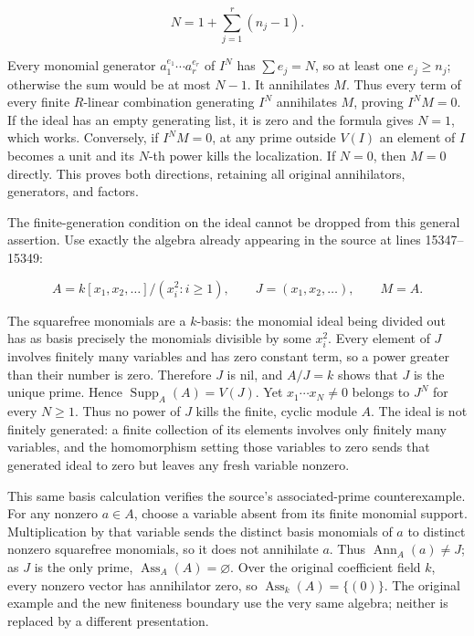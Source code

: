 \[
N=1+\sum_{j=1}^r(n_j-1).
\]

Every monomial generator \(a_1^{e_1}\cdots a_r^{e_r}\) of \(I^N\) has \(\sum e_j=N\), so at least one \(e_j\geq n_j\); otherwise the sum would be at most \(N-1\). It annihilates \(M\). Thus every term of every finite \(R\)-linear combination generating \(I^N\) annihilates \(M\), proving \(I^NM=0\). If the ideal has an empty generating list, it is zero and the formula gives \(N=1\), which works. Conversely, if \(I^NM=0\), at any prime outside \(V(I)\) an element of \(I\) becomes a unit and its \(N\)-th power kills the localization. If \(N=0\), then \(M=0\) directly. This proves both directions, retaining all original annihilators, generators, and factors.

The finite-generation condition on the ideal cannot be dropped from this general assertion. Use exactly the algebra already appearing in the source at lines 15347--15349:

\[
A=k[x_1,x_2,\ldots]/(x_i^2:i\geq1),\qquad
J=(x_1,x_2,\ldots),\qquad M=A.
\]

The squarefree monomials are a \(k\)-basis: the monomial ideal being divided out has as basis precisely the monomials divisible by some \(x_i^2\). Every element of \(J\) involves finitely many variables and has zero constant term, so a power greater than their number is zero. Therefore \(J\) is nil, and \(A/J=k\) shows that \(J\) is the unique prime. Hence \(\operatorname{Supp}_A(A)=V(J)\). Yet \(x_1\cdots x_N\ne0\) belongs to \(J^N\) for every \(N\geq1\). Thus no power of \(J\) kills the finite, cyclic module \(A\). The ideal is not finitely generated: a finite collection of its elements involves only finitely many variables, and the homomorphism setting those variables to zero sends that generated ideal to zero but leaves any fresh variable nonzero.

This same basis calculation verifies the source's associated-prime counterexample. For any nonzero \(a\in A\), choose a variable absent from its finite monomial support. Multiplication by that variable sends the distinct basis monomials of \(a\) to distinct nonzero squarefree monomials, so it does not annihilate \(a\). Thus \(\operatorname{Ann}_A(a)\ne J\); as \(J\) is the only prime, \(\operatorname{Ass}_A(A)=\varnothing\). Over the original coefficient field \(k\), every nonzero vector has annihilator zero, so \(\operatorname{Ass}_k(A)=\{(0)\}\). The original example and the new finiteness boundary use the very same algebra; neither is replaced by a different presentation.

